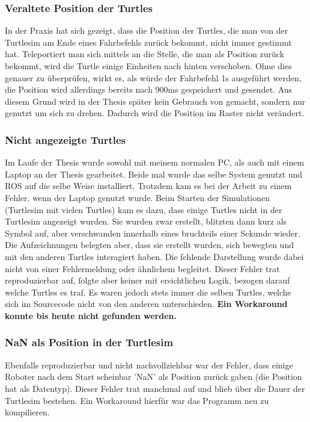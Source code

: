 \subsubsection*{Veraltete Position der Turtles}
In der Praxis hat sich gezeigt, dass die Position der Turtles, die man von der Turtlesim am Ende eines Fahrbefehls zurück bekommt, nicht immer gestimmt hat. Teleportiert man sich mittels  an die Stelle, die man als Position zurück bekommt, wird die Turtle einige Einheiten nach hinten verschoben. Ohne dies genauer zu überprüfen, wirkt es, als würde der Fahrbefehl 1s ausgeführt werden, die Position wird allerdings bereits nach 900ms gespeichert und gesendet.
Aus diesem Grund wird in der Thesis später kein Gebrauch von  gemacht, sondern nur  genutzt um sich zu drehen. Dadurch wird die Position im Raster nicht verändert.

\subsubsection*{Nicht angezeigte Turtles}
Im Laufe der Thesis wurde sowohl mit meinem normalen PC, als auch mit einem Laptop an der Thesis gearbeitet. Beide mal wurde das selbe System genutzt und ROS auf die selbe Weise installiert. Trotzdem kam es bei der Arbeit zu einem Fehler, wenn der Laptop genutzt wurde. Beim Starten der Simulationen (Turtlesim mit vielen Turtles) kam es dazu, dass einige Turtles nicht in der Turtlesim angezeigt wurden. Sie wurden zwar erstellt, blitzten dann kurz als Symbol auf, aber verschwanden innerhalb eines bruchteils einer Sekunde wieder. Die Aufzeichnungen belegten aber, dass sie erstellt wurden, sich bewegten und mit den anderen Turtles interagiert haben. Die fehlende Darstellung wurde dabei nicht von einer Fehlermeldung oder ähnlichem begleitet. Dieser Fehler trat reproduzierbar auf, folgte aber keiner mit ersichtlichen Logik, bezogen darauf welche Turtles es traf. Es waren jedoch stets immer die selben Turtles, welche sich im Sourcecode nicht von den anderen unterschieden. \textbf{Ein Workaround konnte bis heute nicht gefunden werden.}

\subsubsection*{NaN als Position in der Turtlesim}
Ebenfalls reproduzierbar und nicht nachvollziehbar war der Fehler, dass einige Roboter nach dem Start scheinbar 'NaN' als Position zurück gaben (die Position hat  als Datentyp). Dieser Fehler trat manchmal auf und blieb über die Dauer der Turtlesim bestehen. Ein Workaround hierfür war das Programm neu zu kompilieren.

